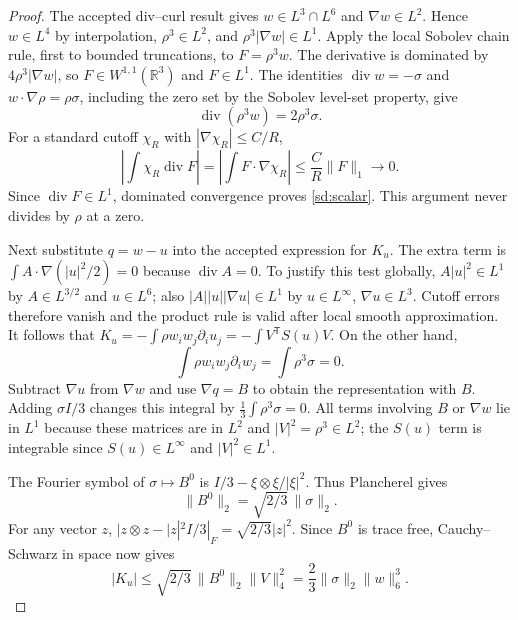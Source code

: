 \begin{proof}
The accepted div--curl result gives $w\in L^3\cap L^6$ and
$\nabla w\in L^2$. Hence $w\in L^4$ by interpolation, $\rho^3\in L^2$,
and $\rho^3|\nabla w|\in L^1$. Apply the local Sobolev chain rule, first
to bounded truncations, to $F=\rho^3w$. The derivative is dominated by
$4\rho^3|\nabla w|$, so $F\in W^{1,1}(\mathbb R^3)$ and $F\in L^1$.
The identities $\operatorname{div}w=-\sigma$ and
$w\cdot\nabla\rho=\rho\sigma$, including the zero set by the Sobolev
level-set property, give
\[
 \operatorname{div}(\rho^3w)=2\rho^3\sigma.
\]
For a standard cutoff $\chi_R$ with $|\nabla\chi_R|\le C/R$,
\[
 \left|\int\chi_R\operatorname{div}F\right|
 =\left|\int F\cdot\nabla\chi_R\right|
 \le\frac CR\|F\|_1\longrightarrow0.
\]
Since $\operatorname{div}F\in L^1$, dominated convergence proves
\eqref{sd:scalar}. This argument never divides by $\rho$ at a zero.

Next substitute $q=w-u$ into the accepted expression for $K_u$.
The extra term is $\int A\cdot\nabla(|u|^2/2)=0$ because
$\operatorname{div}A=0$. To justify this test globally,
$A|u|^2\in L^1$ by $A\in L^{3/2}$ and $u\in L^6$; also
$|A||u||\nabla u|\in L^1$ by $u\in L^\infty$,
$\nabla u\in L^3$. Cutoff errors therefore vanish and the product rule
is valid after local smooth approximation. It follows that
$K_u=-\int\rho w_iw_j\partial_i u_j=-\int V^{\mathsf T}S(u)V$.
On the other hand,
\[
 \int\rho w_iw_j\partial_i w_j=\int\rho^3\sigma=0.
\]
Subtract $\nabla u$ from $\nabla w$ and use $\nabla q=B$ to obtain
the representation with $B$. Adding $\sigma I/3$ changes this integral
by $\frac13\int\rho^3\sigma=0$. All terms involving $B$ or
$\nabla w$ lie in $L^1$ because these matrices are in $L^2$ and
$|V|^2=\rho^3\in L^2$; the $S(u)$ term is integrable since
$S(u)\in L^\infty$ and $|V|^2\in L^1$.

The Fourier symbol of $\sigma\mapsto B^0$ is
$I/3-\xi\otimes\xi/|\xi|^2$. Thus Plancherel gives
\begin{equation}\label{sd:plancherel}
 \|B^0\|_2=\sqrt{2/3}\,\|\sigma\|_2.
\end{equation}
For any vector $z$,
$|z\otimes z-|z|^2I/3|_F=\sqrt{2/3}|z|^2$.
Since $B^0$ is trace free, Cauchy--Schwarz in space now gives
\[
 |K_u|\le\sqrt{2/3}\,\|B^0\|_2\|V\|_4^2
 =\frac23\|\sigma\|_2\|w\|_6^3.
\]
\end{proof}

